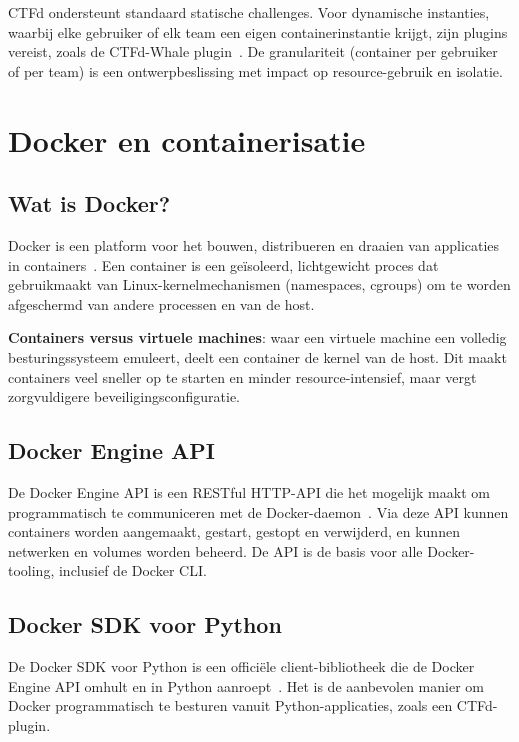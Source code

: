 CTFd ondersteunt standaard statische challenges. Voor dynamische instanties, waarbij elke gebruiker of elk team een eigen containerinstantie krijgt, zijn plugins vereist, zoals de CTFd-Whale plugin~\autocite{CTFdWhale}. De granulariteit (container per gebruiker of per team) is een ontwerpbeslissing met impact op resource-gebruik en isolatie.

\section{Docker en containerisatie}%
\label{sec:docker}

\subsection{Wat is Docker?}

Docker is een platform voor het bouwen, distribueren en draaien van applicaties in containers~\autocite{Arxiv2024,DockerOverview}. Een container is een geïsoleerd, lichtgewicht proces dat gebruikmaakt van Linux-kernelmechanismen (namespaces, cgroups) om te worden afgeschermd van andere processen en van de host.

\textbf{Containers versus virtuele machines}: waar een virtuele machine een volledig besturingssysteem emuleert, deelt een container de kernel van de host. Dit maakt containers veel sneller op te starten en minder resource-intensief, maar vergt zorgvuldigere beveiligingsconfiguratie.

\subsection{Docker Engine API}

De Docker Engine API is een RESTful HTTP-API die het mogelijk maakt om programmatisch te communiceren met de Docker-daemon~\autocite{DockerEngineAPI}. Via deze API kunnen containers worden aangemaakt, gestart, gestopt en verwijderd, en kunnen netwerken en volumes worden beheerd. De API is de basis voor alle Docker-tooling, inclusief de Docker CLI.

\subsection{Docker SDK voor Python}

De Docker SDK voor Python is een officiële client-bibliotheek die de Docker Engine API omhult en in Python aanroept~\autocite{DockerSDKPython}. Het is de aanbevolen manier om Docker programmatisch te besturen vanuit Python-applicaties, zoals een CTFd-plugin.

